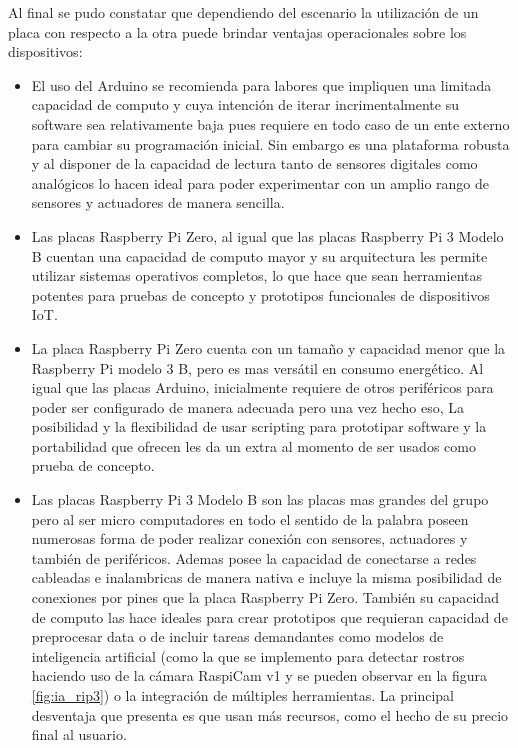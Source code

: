 Al final se pudo constatar que dependiendo del escenario la utilización de un placa con respecto a la otra puede brindar ventajas operacionales sobre los dispositivos:
\begin{itemize}
\item El uso del Arduino se recomienda para labores que impliquen una limitada capacidad de computo y cuya intención de iterar incrimentalmente su software sea relativamente baja pues requiere en todo caso de un ente externo para cambiar su programación inicial. Sin embargo es una plataforma robusta y al disponer de la capacidad de lectura tanto de sensores digitales como analógicos lo hacen ideal para poder experimentar con un amplio rango de sensores y actuadores de manera sencilla. 
\item Las placas Raspberry Pi Zero, al igual que las placas Raspberry Pi 3 Modelo B cuentan una capacidad de computo mayor y su arquitectura les permite utilizar sistemas operativos completos, lo que hace que sean herramientas potentes para pruebas de concepto y prototipos funcionales de dispositivos IoT.
\item La placa Raspberry Pi Zero cuenta con un tamaño y capacidad menor que la Raspberry Pi modelo 3 B, pero es mas versátil en consumo energético. Al igual que las placas Arduino, inicialmente requiere de otros periféricos para poder ser configurado de manera adecuada pero una vez hecho eso, La posibilidad y la flexibilidad de usar scripting para prototipar software y la portabilidad que ofrecen les da un extra al momento de ser usados como prueba de concepto.
\item Las placas Raspberry Pi 3 Modelo B son las placas mas grandes del grupo pero al ser micro computadores en todo el sentido de la palabra poseen numerosas forma de poder realizar conexión con sensores, actuadores y también de periféricos. Ademas posee la capacidad de conectarse a redes cableadas e inalambricas de manera nativa e incluye la misma posibilidad de conexiones por pines que la placa Raspberry Pi Zero. También su capacidad de computo las hace ideales para crear prototipos que requieran capacidad de preprocesar data o de incluir tareas demandantes como modelos de inteligencia artificial (como la que se implemento para detectar rostros haciendo uso de la cámara RaspiCam v1 y se pueden observar en la figura \ref{fig:ia_rip3})  o la integración de múltiples herramientas. La principal desventaja que presenta es que usan más recursos, como el hecho de su precio final al usuario.  
\begin{figure}[htb]

\end{figure}
\end{itemize}
